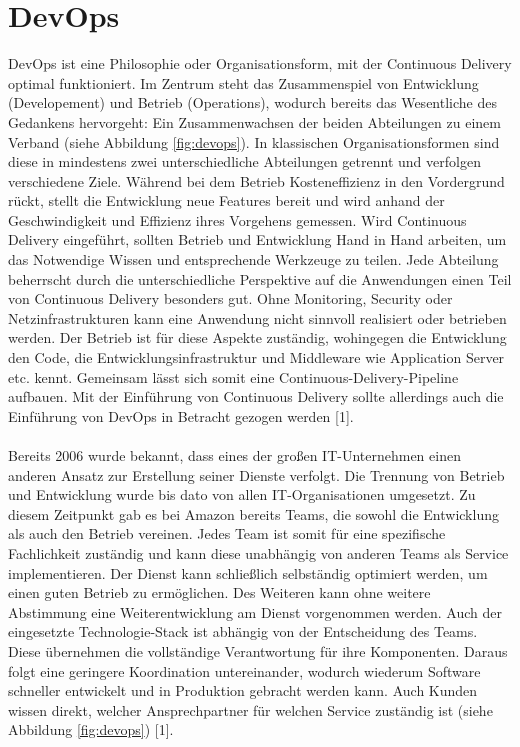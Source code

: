 \section{DevOps}
DevOps ist eine Philosophie oder Organisationsform, mit der Continuous Delivery optimal funktioniert. Im Zentrum steht das Zusammenspiel von Entwicklung (Developement) und Betrieb (Operations), wodurch bereits das Wesentliche des Gedankens hervorgeht: Ein Zusammenwachsen der beiden Abteilungen zu einem Verband (siehe Abbildung \ref{fig:devops}). In klassischen Organisationsformen sind diese in mindestens zwei unterschiedliche Abteilungen getrennt und verfolgen verschiedene Ziele. Während bei dem Betrieb Kosteneffizienz in den Vordergrund rückt, stellt die Entwicklung neue Features bereit und wird anhand der Geschwindigkeit und Effizienz ihres Vorgehens gemessen. Wird Continuous Delivery eingeführt, sollten Betrieb und Entwicklung Hand in Hand arbeiten, um das Notwendige Wissen und entsprechende Werkzeuge zu teilen. Jede Abteilung beherrscht durch die unterschiedliche Perspektive auf die Anwendungen einen Teil von Continuous Delivery besonders gut. Ohne Monitoring, Security oder Netzinfrastrukturen kann eine Anwendung nicht sinnvoll realisiert oder betrieben werden. Der Betrieb ist für diese Aspekte zuständig, wohingegen die Entwicklung den Code, die Entwicklungsinfrastruktur und Middleware wie Application Server etc. kennt. Gemeinsam lässt sich somit eine Continuous-Delivery-Pipeline aufbauen. Mit der Einführung von Continuous Delivery sollte allerdings auch die Einführung von DevOps in Betracht gezogen werden [1].\\ \\
Bereits 2006 wurde bekannt, dass eines der großen IT-Unternehmen einen anderen Ansatz zur Erstellung seiner Dienste verfolgt. Die Trennung von Betrieb und Entwicklung wurde bis dato von allen IT-Organisationen umgesetzt. Zu diesem Zeitpunkt gab es bei Amazon bereits Teams, die sowohl die Entwicklung als auch den Betrieb vereinen. Jedes Team ist somit für eine spezifische Fachlichkeit zuständig und kann diese unabhängig von anderen Teams als Service implementieren. Der Dienst kann schließlich selbständig optimiert werden, um einen guten Betrieb zu ermöglichen. Des Weiteren kann ohne weitere Abstimmung eine Weiterentwicklung am Dienst vorgenommen werden. Auch der eingesetzte Technologie-Stack ist abhängig von der Entscheidung des Teams. Diese übernehmen die vollständige Verantwortung für ihre Komponenten. Daraus folgt eine geringere Koordination untereinander, wodurch wiederum Software schneller entwickelt und in Produktion gebracht werden kann. Auch Kunden wissen direkt, welcher Ansprechpartner für welchen Service zuständig ist (siehe Abbildung \ref{fig:devops}) [1].\\ \\
